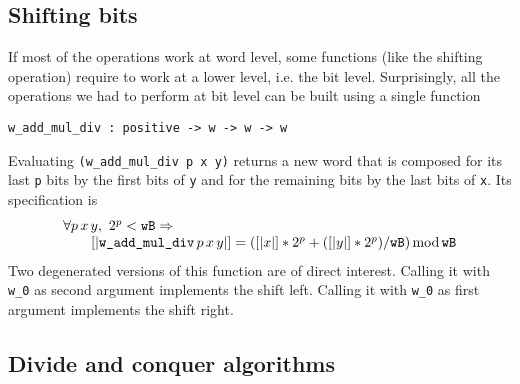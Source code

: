 \subsection{Shifting bits}

If most of the operations work at word level, some functions (like the
shifting operation) require to work at a lower level, i.e. the bit level.
Surprisingly, all the operations we had to perform at bit level can be built
using a single function
\begin{verbatim}
w_add_mul_div : positive -> w -> w -> w
\end{verbatim}
Evaluating  {\tt (w\_add\_mul\_div p x y)} returns a new word that
is composed for its last {\tt p} bits by the first bits of {\tt y}
and for the remaining bits by the last bits of {\tt x}.
Its specification is 
$$\begin{array}{l}
\forall p\, x\, y, \,\, 2 ^ p < {\texttt{wB}}  \Rightarrow \\
\hskip20pt [|\textit{\tt{w\_add\_mul\_div}}\, p\, x\, y|] = ([|x|] * 2 ^ p + ([|y|] * 2 ^ p) / {\texttt{wB}}) \,\mbox{mod}\, {\texttt{wB}}
\end{array}
$$
Two degenerated versions of this function are of direct interest. Calling it
with {\tt w\_0} as second argument implements
the shift left. Calling it with {\tt w\_0} as first argument implements
the shift right.

\subsection{Divide and conquer algorithms}

